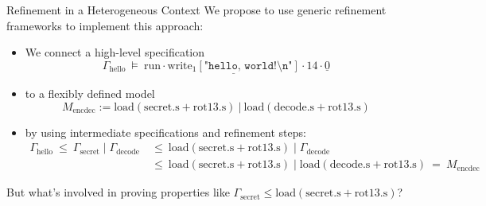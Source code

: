 \documentclass[aspectratio=1610,mathserif]{beamer}
\newcommand{\kw}[1]{\ensuremath{ \mathrm{#1} }}
\begin{document}
\begin{frame}{Refinement in a Heterogeneous Context}
  We propose to use generic refinement frameworks
  to implement this approach:
  \begin{itemize}
    \pause \item We connect a high-level specification
       \[ \Gamma_\kw{hello} \: \vDash \:
          \kw{run} \cdot
        \underline{\kw{write}_1[\texttt{"hello, world!\textbackslash{}n"}]} \cdot
        14 \cdot \underline{0} \]

    \pause \item to a flexibly defined model
       \[ M_\kw{encdec} :=
          \kw{load}(\kw{secret.s} + \kw{rot13.s})
          \:\mathbin{\mathtt{|}}\:
          \kw{load}(\kw{decode.s} + \kw{rot13.s}) \]

    \pause \item by using intermediate specifications and refinement steps:
      \begin{align*}
        \Gamma_\kw{hello}
           \:\le\: \Gamma_\kw{secret} \mathbin| \Gamma_\kw{decode}
          &\:\le\: \kw{load}(\kw{secret.s} + \kw{rot13.s}) \mathbin| \Gamma_\kw{decode} \\
          &\:\le\: \kw{load}(\kw{secret.s} + \kw{rot13.s}) \mathbin| \kw{load}(\kw{decode.s} + \kw{rot13.s})
           \:=\: M_\kw{encdec}
      \end{align*}
  \end{itemize}
  \pause
  But what's involved in proving properties like
  $\Gamma_\kw{secret} \le \kw{load}(\kw{secret.s} + \kw{rot13.s})$?
\end{frame}
\end{document}
